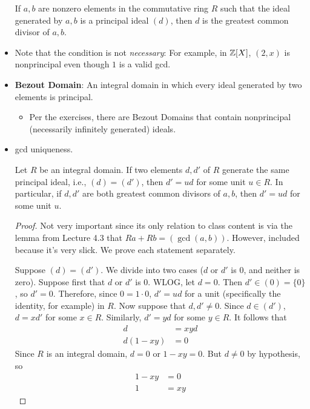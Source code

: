 \documentclass[../notes.tex]{subfiles}
\begin{document}
\begin{itemize}
    \begin{proposition}\label{prp:8.2}
        If $a,b$ are nonzero elements in the commutative ring $R$ such that the ideal generated by $a,b$ is a principal ideal $(d)$, then $d$ is the greatest common divisor of $a,b$.
    \end{proposition}
    \item Note that the condition is not \emph{necessary}: For example, in $\mathbb{Z}[X]$, $(2,x)$ is nonprincipal even though $1$ is a valid gcd.
    \item \textbf{Bezout Domain}: An integral domain in which every ideal generated by two elements is principal.
    \begin{itemize}
        \item Per the exercises, there are Bezout Domains that contain nonprincipal (necessarily infinitely generated) ideals.
    \end{itemize}
    \item gcd uniqueness.
    \begin{proposition}\label{prp:8.3}
        Let $R$ be an integral domain. If two elements $d,d'$ of $R$ generate the same principal ideal, i.e., $(d)=(d')$, then $d'=ud$ for some unit $u\in R$. In particular, if $d,d'$ are both greatest common divisors of $a,b$, then $d'=ud$ for some unit $u$.
        \begin{proof}
            Not very important since its only relation to class content is via the lemma from Lecture 4.3 that $Ra+Rb=(\gcd(a,b))$. However, included because it's very slick. We prove each statement separately.\par\smallskip
            Suppose $(d)=(d')$. We divide into two cases ($d$ or $d'$ is 0, and neither is zero). Suppose first that $d$ or $d'$ is 0. WLOG, let $d=0$. Then $d'\in(0)=\{0\}$, so $d'=0$. Therefore, since $0=1\cdot 0$, $d'=ud$ for a unit (specifically the identity, for example) in $R$. Now suppose that $d,d'\neq 0$. Since $d\in(d')$, $d=xd'$ for some $x\in R$. Similarly, $d'=yd$ for some $y\in R$. It follows that
            \begin{align*}
                d &= xyd\\
                d(1-xy) &= 0
            \end{align*}
            Since $R$ is an integral domain, $d=0$ or $1-xy=0$. But $d\neq 0$ by hypothesis, so
            \begin{align*}
                1-xy &= 0\\
                1 &= xy
            \end{align*}

\end{proof}
\end{proposition}
\end{itemize}
\end{document}
